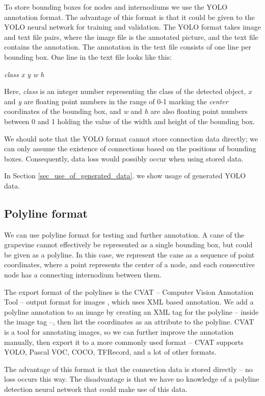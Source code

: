 \documentclass{PSAIE}%
\begin{document}
To store
bounding boxes for nodes and internodiums we use the YOLO annotation format. The advantage of this format
is that it could be given to the YOLO neural network for training and validation. The YOLO format takes image
and text file pairs, where the image file is the annotated picture, and the text file contains the annotation.
The annotation in the text file consists of one line per bounding box. One line in the text file looks like
this:

\textit{class x y w h}

Here, \textit{class} is an integer number representing the class of the detected object, \textit{x} and
\textit{y} are floating point numbers in the range of 0-1 marking the \textit{center} coordinates of the
bounding box, and \textit{w} and \textit{h} are also floating point numbers between 0 and 1 holding the
value of the width and height of the bounding box.

We should note that the YOLO format cannot store connection data directly; we can only assume the existence
of connections based on the positions of bounding boxes. Consequently, data loss would possibly occur
when using stored data.

In Section \ref{sec_use_of_generated_data}. we show usage of generated YOLO data.

\subsection{Polyline format} \label{sec_export_polyline_format}
We can use polyline format for testing and further annotation. A cane of the grapevine cannot effectively
be represented as a single bounding box, but could be given as a polyline. In this case, we represent the cane
as a sequence of point coordinates, where a point represents the center of a node, and each consecutive
node has a connecting internodium between them.

The export format of the polylines is the CVAT -- Computer Vision Annotation Tool -- output format for
images \cite{boris_sekachev_2020_4009388}, which uses XML based annotation. We add a polyline annotation
to an image by creating an XML tag for the polyline -- inside the image tag --, then list the coordinates
as an attribute to the polyline. CVAT is a tool for annotating images, so we can further improve the
annotation manually, then export it to a more commonly used format -- CVAT supports YOLO, Pascal VOC, COCO,
TFRecord, and a lot of other formats.

The advantage of this format is that the connection data is stored directly -- no loss occurs this way.
The disadvantage is that we have no knowledge of a polyline detection neural network that could make use of
this data.
\end{document}
